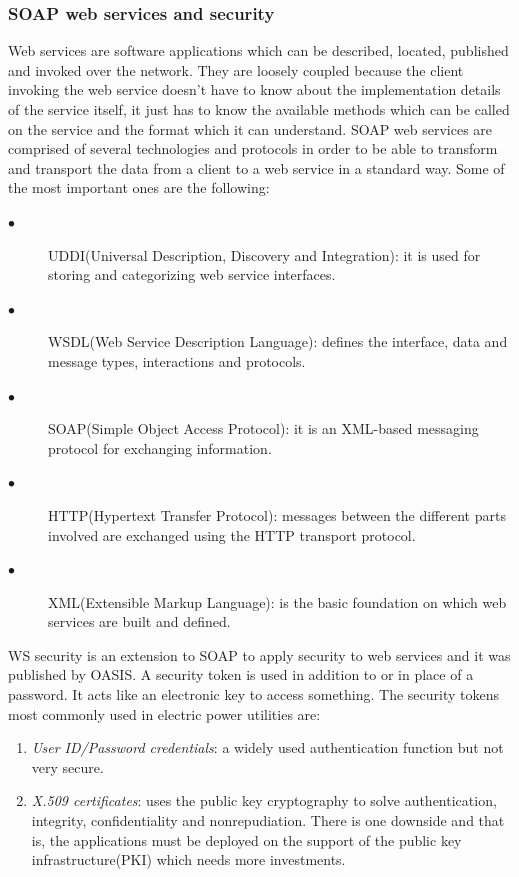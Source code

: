 \documentclass[twosided,a4,10pt]{article}
\begin{document}
\begin{multicols}{2}
  	\subsubsection{SOAP web services and security}
  	 Web services are software applications which can be described, located, published and invoked over the network. They are loosely coupled because the client invoking the web service doesn't have to know about the implementation details of the service itself, it just has to know the available methods which can be called on the service and the format which it can understand. SOAP web services are comprised of several technologies and protocols in order to be able to transform and transport the data from a client to a web service in a standard way. Some of the most important ones are the following:
  	\begin{description}
  		\item[$\bullet$] 
  		UDDI(Universal Description, Discovery and Integration): it is used for storing and categorizing web service interfaces.
  		\item[$\bullet$]
  		WSDL(Web Service Description Language): defines the interface, data and message types, interactions and protocols.
  		\item[$\bullet$]
  		SOAP(Simple Object Access Protocol): it is an XML-based messaging protocol for exchanging information.
  		\item[$\bullet$]
  		HTTP(Hypertext Transfer Protocol): messages between the different parts involved are exchanged using the HTTP transport protocol.
  		\item[$\bullet$]
  		XML(Extensible Markup Language): is the basic foundation on which web services are built and defined.
  	\end{description} 	
  	WS security is an extension to SOAP to apply security to web services and it was published by OASIS. A security token is used in addition to or in place of a password. It acts like an electronic key to access something. The security tokens most commonly used in electric power utilities are:
  	\begin{enumerate}
  		\item \textit{User ID/Password credentials}: a widely used authentication function but not very secure.
  		\item \textit{X.509 certificates}: uses the public key cryptography to solve authentication, integrity, confidentiality and nonrepudiation. There is one downside and that is, the applications must be deployed on the support of the public key infrastructure(PKI) which needs more investments. 
  	\end{enumerate}
  	

\end{multicols}
\end{document}
